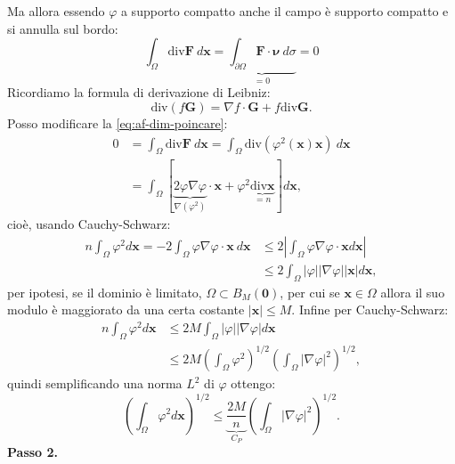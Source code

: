 \documentclass[10pt,a4paper,twoside,openright]{book}
\newcommand{\x}{\mathbf{x}}
\newcommand{\zer}{\mathbf{0}}
\begin{document}
\begin{dimostrazione}
	Ma allora essendo $\varphi $ a supporto compatto anche il campo è supporto compatto e si annulla sul bordo:
	\begin{equation}
		\int _{\Omega }\mathrm{div}\mathbf{F} \ d\x =\underbrace{\int _{\partial \Omega }\mathbf{F} \cdotp \bm{\nu }\ d\sigma }_{=0} =0
		\label{eq:af-dim-poincare}
	\end{equation}
	Ricordiamo la formula di derivazione di Leibniz:
	\begin{equation*}
		\mathrm{div}( f\mathbf{G}) =\nabla f\cdotp \mathbf{G} +f\mathrm{div}\mathbf{G} .
	\end{equation*}
	Posso modificare la \eqref{eq:af-dim-poincare}:
	\begin{align*}
		0 & =\int _{\Omega }\mathrm{div}\mathbf{F} \ d\x =\int _{\Omega }\mathrm{div}\left( \varphi ^{2}(\x)\x\right) \ d\x                                              \\
		  & =\int _{\Omega }\left[\underbrace{2\varphi \nabla \varphi }_{\nabla \left( \varphi ^{2}\right)} \cdotp \x +\varphi ^{2}\underbrace{\mathrm{div}\x}_{=n}\right] d\x , 
	\end{align*}
	cioè, usando Cauchy-Schwarz:
	\begin{align*}
		n\int _{\Omega } \varphi ^{2} d\x =-2\int _{\Omega } \varphi \nabla \varphi \cdotp \x \ d\x & \leqslant 2\left| \int _{\Omega } \varphi \nabla \varphi \cdotp \x d\x\right| \\
		                                                                                                                    & \leqslant 2\int _{\Omega }| \varphi | | \nabla \varphi | | \x| d\x ,          
	\end{align*}
	per ipotesi, se il dominio è limitato, $\displaystyle \Omega \subset B_{M}(\zer)$, per cui se $\displaystyle \x \in \Omega $ allora il suo modulo è maggiorato da una certa costante $\displaystyle | \x| \leqslant M$. Infine per Cauchy-Schwarz:
	\begin{align*}
		n\int _{\Omega } \varphi ^{2} d\x & \leqslant 2M\int _{\Omega }| \varphi | | \nabla \varphi | d\x                                                  \\
		                                          & \leqslant 2M\left(\int _{\Omega } \varphi ^{2}\right)^{1/2}\left(\int _{\Omega }| \nabla \varphi | ^{2}\right)^{1/2} , 
	\end{align*}
	quindi semplificando una norma $\displaystyle L^{2}$ di $\displaystyle \varphi $ ottengo:
	\begin{equation*}
		\left(\int _{\Omega } \varphi ^{2} d\x\right)^{1/2} \leqslant \underbrace{\frac{2M}{n}}_{C_{P}}\left(\int _{\Omega }| \nabla \varphi | ^{2}\right)^{1/2} .
	\end{equation*}
	\textbf{Passo 2.}
	

\end{dimostrazione}
\end{document}
